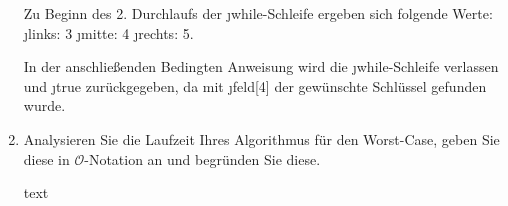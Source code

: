 \documentclass{lehramt-informatik-aufgabe}
\begin{document}
\begin{enumerate}
\begin{liAntwort}
Zu Beginn des 2. Durchlaufs der \j{while}-Schleife ergeben sich folgende
Werte: \j{links}: 3 \j{mitte}: 4 \j{rechts}: 5.

In der anschließenden Bedingten Anweisung wird die \j{while}-Schleife
verlassen und \j{true} zurückgegeben, da mit \j{feld[4]} der gewünschte
Schlüssel gefunden wurde.
\end{liAntwort}


\item Analysieren Sie die Laufzeit Ihres Algorithmus für den Worst-Case,
geben Sie diese in $\mathcal{O}$-Notation an und begründen Sie diese.

\begin{liAntwort}
text
\end{liAntwort}





\end{enumerate}
\end{document}

